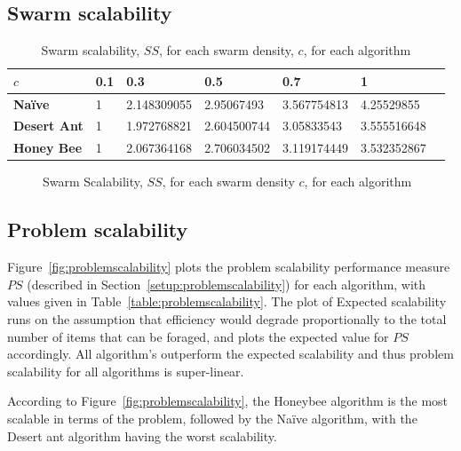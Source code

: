 \subsection{Swarm scalability}
\begin{table}[]
\centering
\caption{Swarm scalability, $SS$, for each swarm density, $c$, for each algorithm}
\label{table:swarmscalability}
\begin{tabular}{@{}lllllll@{}}
\toprule
\textbf{$c$}            & \textbf{0.1} & \textbf{0.3}         & \textbf{0.5}         & \textbf{0.7}         & \textbf{1}           \\ \midrule
\textbf{Na\"ive}    & 1   & 2.148309055 & 2.95067493  & 3.567754813 & 4.25529855  \\
\textbf{Desert Ant} & 1   & 1.972768821 & 2.604500744 & 3.05833543  & 3.555516648 \\
\textbf{Honey Bee}  & 1   & 2.067364168 & 2.706034502 & 3.119174449 & 3.532352867 \\ \bottomrule
\end{tabular}
\end{table}

\begin{figure}[!htb]
\centering
\small
\resizebox{\textwidth}{!}{}
\caption{Swarm Scalability, $SS$, for each swarm density $c$, for each algorithm}
\label{fig:swarmscalability}
\end{figure}


\subsection{Problem scalability}


Figure~\ref{fig:problemscalability} plots the problem scalability performance measure $PS$ (described in Section~\ref{setup:problemscalability}) for each algorithm, with values given in Table~\ref{table:problemscalability}. The plot of Expected scalability runs on the assumption that efficiency would degrade proportionally to the total number of items that can be foraged, and plots the expected value for $PS$ accordingly. All algorithm's outperform the expected scalability and thus problem scalability for all algorithms is super-linear. %

According to Figure~\ref{fig:problemscalability}, the Honeybee algorithm is the most scalable in terms of the problem, followed by the Na\"ive algorithm, with the Desert ant algorithm having the worst scalability. %

